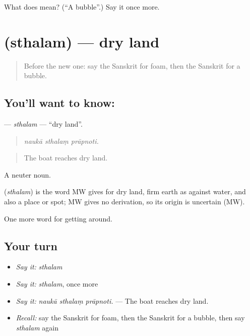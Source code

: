 \begin{tcolorbox}[breakable,colback=teal!4,colframe=teal!35!black,title={Before you move on}]
What does  mean? (\textquotedblleft{}A bubble\textquotedblright{}.) Say it once more.
\end{tcolorbox}
\section[\texorpdfstring{\sk{स्थलम्} (sthalam)}{स्थलम् (sthalam)}]{ (sthalam) — dry land}

\label{lesson:SA-C417-sthalam}



\begin{quote}
Before the new one: say the Sanskrit for foam, then the Sanskrit for a bubble.
\end{quote}

\subsection*{You'll want to know: }
\textbf{} — \emph{sthalam} — \textquotedblleft{}dry land\textquotedblright{}.

\begin{quote}
  
\end{quote}

\begin{quote}
\emph{naukā sthalaṃ prāpnoti.}
\end{quote}

\begin{quote}
The boat reaches dry land.
\end{quote}

A neuter noun.

\begin{cousinweb}
\textbf{} (\emph{sthalam}) is the word MW gives for dry land, firm earth as against water, and also a place or spot; MW gives no derivation, so its origin is uncertain (MW).
\end{cousinweb}

\begin{grammarlens}[title={What you've built}]
One more word for getting around.
\end{grammarlens}

\subsection*{Your turn}
\begin{itemize}
\raggedright
  \item \emph{Say it:} \emph{sthalam}
  \item \emph{Say it:} \emph{sthalam}, once more
  \item \emph{Say it:} \emph{naukā sthalaṃ prāpnoti.} — The boat reaches dry land.
  \item \emph{Recall:} say the Sanskrit for foam, then the Sanskrit for a bubble, then say \emph{sthalam} again
\end{itemize}

